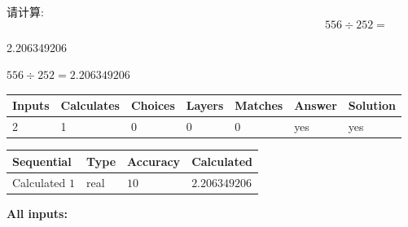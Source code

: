 \documentclass{ctexart}
\begin{document}
  
 
请计算:
\begin{equation}
556  \div    %
252 = \nonumber
\end{equation}
 
 
 
\noindent{}
 
 

2.206349206
 
 
\noindent{}
 
 

 
 
 
\noindent{}
 
 

$ %
556 \div  %
252=   %
2.206349206$
 
 
\noindent{}
 
 

 
   
   
   
   
\noindent\begin{tabular}{|l|l|l|l|l|l|l|}
 \hline
Inputs & Calculates & Choices & Layers & Matches & Answer & Solution \\ \hline
 2  & 
 1  & 
 0
  & 
 0  & 
 0  & 
  yes & 
  yes 
  \\ \hline
 \end{tabular}
   
   
   
   
\noindent{}
   
   
  
  
\noindent\begin{tabular}{|l|l|l|l|}
\hline
 Sequential & Type & Accuracy & Calculated \\ 
\hline
 
 
  Calculated $  1 $ & real & $  10  $ & 
 $ 2.206349206 $ 
 \\  \hline  
 \end{tabular}
   
   
   
   
\noindent\vspace{0.1in}\hspace{-0.08in} {\textbf{\Large{All inputs: }}}
   
\end{document}
